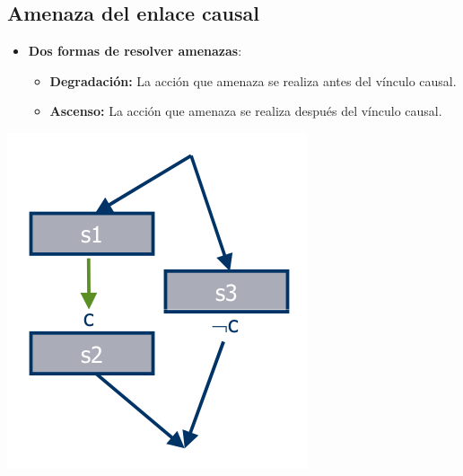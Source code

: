 \documentclass[11pt]{article}
\begin{document}
\subsection*{Amenaza del enlace causal}
\label{sec:org7cebfff}
\begin{itemize}
\item \textbf{{\color{green}Dos formas de resolver amenazas}}:
\begin{itemize}
\item \textbf{Degradación:} La acción que amenaza se realiza antes del vínculo causal.
\item \textbf{Ascenso:} La acción que amenaza se realiza después del vínculo causal.
\end{itemize}
\end{itemize}
\begin{center}
\includegraphics[width=.9\linewidth]{imagenes/amenazaCausal.png}
\end{center}
\end{document}
